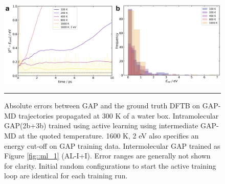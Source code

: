 \documentclass[../../main.tex]{subfiles}
\begin{document}
\begin{figure}[h!]
	\vspace{0.4cm}
	\centering
	\includegraphics[width=\textwidth]{6/gap/figs_si/fig13}
	\vspace{0.2cm}
	\hrule
	\caption{Absolute errors between GAP and the ground truth DFTB on GAP-MD trajectories propagated at 300 K of a water box. Intramolecular GAP(2b+3b) trained using active learning using intermediate GAP-MD at the quoted temperature. 1600 K, 2 eV also specifies an energy cut-off on GAP training data. Intermolecular GAP trained as Figure \ref{fig::ml_1} (AL-I+I). Error ranges are generally not shown for clarity. Initial random configurations to start the active training loop are identical for each training run.}
	\label{fig::ml_si_13}
\end{figure}
\end{document}
